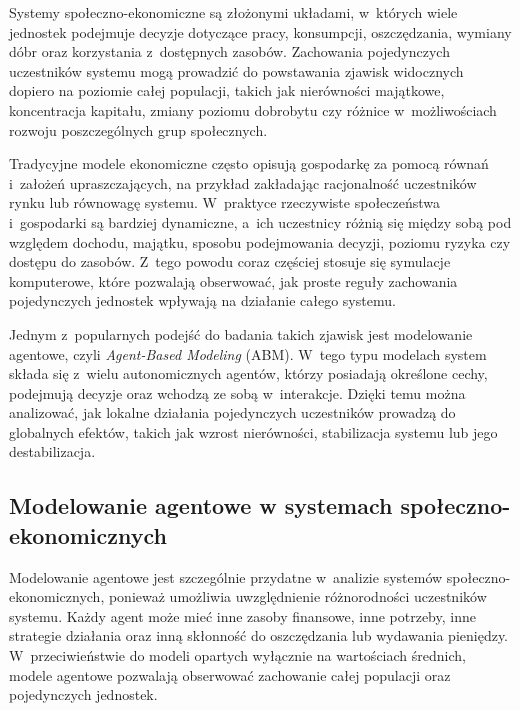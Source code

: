 \documentclass[polish]{projectreport}
\begin{document}
Systemy spo\l{}eczno-ekonomiczne s\k{a} z\l{}o\.{z}onymi uk\l{}adami, w~kt\'orych wiele jednostek podejmuje
decyzje dotycz\k{a}ce pracy, konsumpcji, oszcz\k{e}dzania, wymiany d\'obr oraz korzystania
z~dost\k{e}pnych zasob\'ow. Zachowania pojedynczych uczestnik\'ow systemu mog\k{a} prowadzi\'{c} do
powstawania zjawisk widocznych dopiero na poziomie ca\l{}ej populacji, takich jak
nier\'owno\'sci maj\k{a}tkowe, koncentracja kapita\l{}u, zmiany poziomu dobrobytu czy r\'o\.{z}nice
w~mo\.{z}liwo\'sciach rozwoju poszczeg\'olnych grup spo\l{}ecznych.

Tradycyjne modele ekonomiczne cz\k{e}sto opisuj\k{a} gospodark\k{e} za pomoc\k{a} r\'owna\'n i~za\l{}o\.{z}e\'n
upraszczaj\k{a}cych, na przyk\l{}ad zak\l{}adaj\k{a}c racjonalno\'s\'{c} uczestnik\'ow rynku lub r\'ownowag\k{e}
systemu. W~praktyce rzeczywiste spo\l{}ecze\'nstwa i~gospodarki s\k{a} bardziej dynamiczne,
a~ich uczestnicy r\'o\.{z}ni\k{a} si\k{e} mi\k{e}dzy sob\k{a} pod wzgl\k{e}dem dochodu, maj\k{a}tku, sposobu
podejmowania decyzji, poziomu ryzyka czy dost\k{e}pu do zasob\'ow. Z~tego powodu coraz
cz\k{e}\'sciej stosuje si\k{e} symulacje komputerowe, kt\'ore pozwalaj\k{a} obserwowa\'{c}, jak proste
regu\l{}y zachowania pojedynczych jednostek wp\l{}ywaj\k{a} na dzia\l{}anie ca\l{}ego systemu.

Jednym z~popularnych podej\'s\'{c} do badania takich zjawisk jest modelowanie agentowe,
czyli \emph{Agent-Based Modeling} (ABM). W~tego typu modelach system sk\l{}ada si\k{e}
z~wielu autonomicznych agent\'ow, kt\'orzy posiadaj\k{a} okre\'slone cechy, podejmuj\k{a} decyzje
oraz wchodz\k{a} ze sob\k{a} w~interakcje. Dzi\k{e}ki temu mo\.{z}na analizowa\'{c}, jak lokalne dzia\l{}ania
pojedynczych uczestnik\'ow prowadz\k{a} do globalnych efekt\'ow, takich jak wzrost nier\'owno\'sci,
stabilizacja systemu lub jego destabilizacja.

\subsection{Modelowanie agentowe w systemach spo\l{}eczno-ekonomicznych}
\label{sec:abm}

Modelowanie agentowe jest szczeg\'olnie przydatne w~analizie system\'ow
spo\l{}eczno-\allowbreak ekonomicznych, poniewa\.{z} umo\.{z}liwia uwzgl\k{e}dnienie r\'o\.{z}norodno\'sci uczestnik\'ow
systemu. Ka\.{z}dy agent mo\.{z}e mie\'{c} inne zasoby finansowe, inne potrzeby, inne strategie
dzia\l{}ania oraz inn\k{a} sk\l{}onno\'s\'{c} do oszcz\k{e}dzania lub wydawania pieni\k{e}dzy. W~przeciwie\'nstwie
do modeli opartych wy\l{}\k{a}cznie na warto\'sciach \'srednich, modele agentowe pozwalaj\k{a}
obserwowa\'{c} zachowanie ca\l{}ej populacji oraz pojedynczych jednostek.
\end{document}

